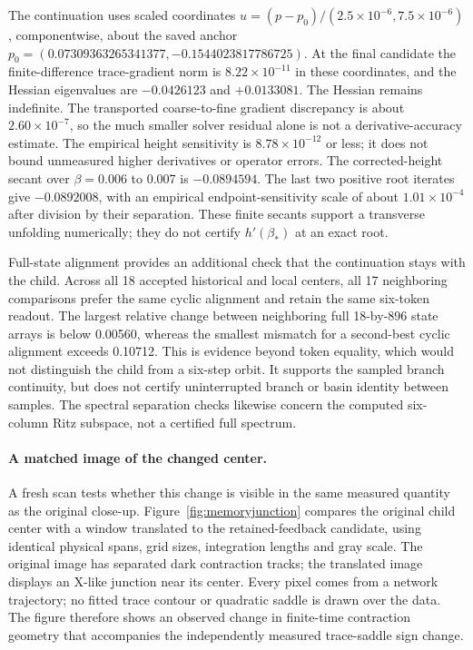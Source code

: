 \documentclass[11pt,letterpaper]{article}
\begin{document}
The continuation uses scaled coordinates
$u=(p-p_0)/(2.5\times10^{-6},7.5\times10^{-6})$, componentwise, about the saved anchor
$p_0=(0.07309363265341377,-0.1544023817786725)$. At the final candidate the finite-difference trace-gradient
norm is $8.22\times10^{-11}$ in these coordinates, and the Hessian eigenvalues are $-0.0426123$ and $+0.0133081$.
The Hessian remains indefinite. The transported coarse-to-fine gradient discrepancy is about
$2.60\times10^{-7}$, so the much smaller solver residual alone is not a derivative-accuracy estimate. The empirical
height sensitivity is $8.78\times10^{-12}$ or less; it does not bound unmeasured higher derivatives or operator
errors. The corrected-height secant over $\beta=0.006$ to 0.007 is $-0.0894594$. The last two positive root iterates
give $-0.0892008$, with an empirical endpoint-sensitivity scale of about $1.01\times10^{-4}$ after division by
their separation. These finite secants support a transverse unfolding numerically; they do not certify
$h'(\beta_*)$ at an exact root.

Full-state alignment provides an additional check that the continuation stays with the child. Across all 18
accepted historical and local centers, all 17 neighboring comparisons prefer the same cyclic alignment and retain
the same six-token readout. The largest relative change between neighboring full 18-by-896 state arrays is below
0.00560, whereas the smallest mismatch for a second-best cyclic alignment exceeds 0.10712. This is evidence beyond
token equality, which would not distinguish the child from a six-step orbit. It supports the sampled branch
continuity, but does not certify uninterrupted branch or basin identity between samples. The spectral separation
checks likewise concern the computed six-column Ritz subspace, not a certified full spectrum.

\paragraph{A matched image of the changed center.} A fresh scan tests whether this change is visible in the
same measured quantity as the original close-up. Figure~\ref{fig:memoryjunction} compares the original child
center with a window translated to the retained-feedback candidate, using identical physical spans, grid sizes,
integration lengths and gray scale. The original image has separated dark contraction tracks; the translated
image displays an X-like junction near its center. Every pixel comes from a network trajectory; no fitted
trace contour or quadratic saddle is drawn over the data. The figure therefore shows an observed change in
finite-time contraction geometry that accompanies the independently measured trace-saddle sign change.
\end{document}
